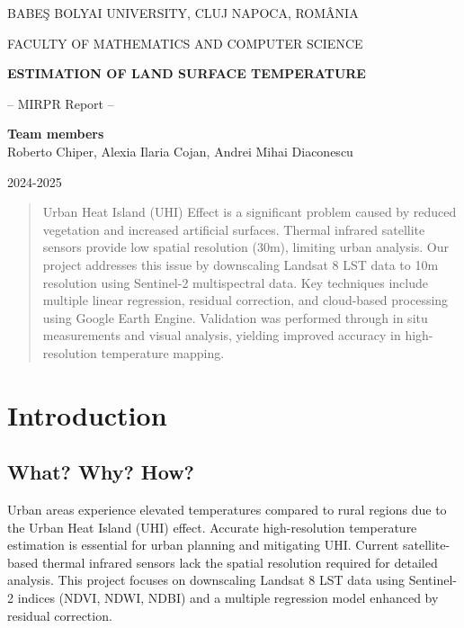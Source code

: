 \documentclass[runningheads,a4paper,11pt]{report}
\begin{document}
\begin{titlepage}
\sloppy

\begin{center}
BABE\c S BOLYAI UNIVERSITY, CLUJ NAPOCA, ROM\^ ANIA

FACULTY OF MATHEMATICS AND COMPUTER SCIENCE

\vspace{6cm}

\Huge \textbf{ESTIMATION OF LAND SURFACE TEMPERATURE}

\vspace{1cm}

\normalsize -- MIRPR Report --

\end{center}

\vspace{5cm}

\begin{flushright}
\Large{\textbf{Team members}}\\
Roberto Chiper, Alexia Ilaria Cojan, Andrei Mihai Diaconescu\\
\end{flushright}

\begin{center}
2024-2025
\end{center}

\end{titlepage}


\begin{abstract}
Urban Heat Island (UHI) Effect is a significant problem caused by reduced vegetation and increased artificial surfaces. Thermal infrared satellite sensors provide low spatial resolution (30m), limiting urban analysis. Our project addresses this issue by downscaling Landsat 8 LST data to 10m resolution using Sentinel-2 multispectral data. Key techniques include multiple linear regression, residual correction, and cloud-based processing using Google Earth Engine. Validation was performed through in situ measurements and visual analysis, yielding improved accuracy in high-resolution temperature mapping.
\end{abstract}

\tableofcontents
\newpage

\chapter{Introduction}
\section{What? Why? How?}
Urban areas experience elevated temperatures compared to rural regions due to the Urban Heat Island (UHI) effect. Accurate high-resolution temperature estimation is essential for urban planning and mitigating UHI. Current satellite-based thermal infrared sensors lack the spatial resolution required for detailed analysis. This project focuses on downscaling Landsat 8 LST data using Sentinel-2 indices (NDVI, NDWI, NDBI) and a multiple regression model enhanced by residual correction.
\end{document}
